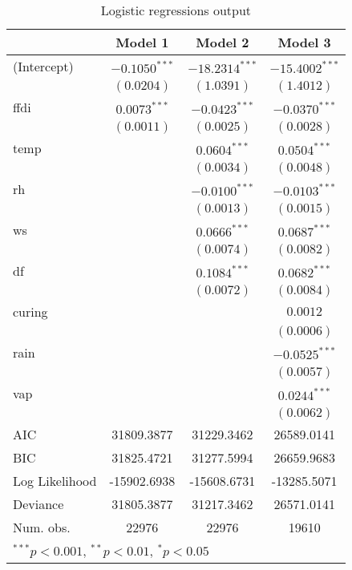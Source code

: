\documentclass{article}
\begin{document}
\begin{table}
	\begin{center}
		\begin{tabular}{l c c c }
			\hline
			& Model 1 & Model 2 & Model 3 \\
		\hline
		(Intercept)    & $-0.1050^{***}$ & $-18.2314^{***}$ & $-15.4002^{***}$ \\
		& $(0.0204)$      & $(1.0391)$       & $(1.4012)$       \\
		ffdi           & $0.0073^{***}$  & $-0.0423^{***}$  & $-0.0370^{***}$  \\
		& $(0.0011)$      & $(0.0025)$       & $(0.0028)$       \\
		temp           &                 & $0.0604^{***}$   & $0.0504^{***}$   \\
		&                 & $(0.0034)$       & $(0.0048)$       \\
		rh             &                 & $-0.0100^{***}$  & $-0.0103^{***}$  \\
		&                 & $(0.0013)$       & $(0.0015)$       \\
		ws             &                 & $0.0666^{***}$   & $0.0687^{***}$   \\
		&                 & $(0.0074)$       & $(0.0082)$       \\
		df             &                 & $0.1084^{***}$   & $0.0682^{***}$   \\
		&                 & $(0.0072)$       & $(0.0084)$       \\
		curing         &                 &                  & $0.0012$         \\
		&                 &                  & $(0.0006)$       \\
		rain           &                 &                  & $-0.0525^{***}$  \\
		&                 &                  & $(0.0057)$       \\
		vap            &                 &                  & $0.0244^{***}$   \\
		&                 &                  & $(0.0062)$       \\
		\hline
		AIC            & 31809.3877      & 31229.3462       & 26589.0141       \\
		BIC            & 31825.4721      & 31277.5994       & 26659.9683       \\
		Log Likelihood & -15902.6938     & -15608.6731      & -13285.5071      \\
		Deviance       & 31805.3877      & 31217.3462       & 26571.0141       \\
		Num. obs.      & 22976           & 22976            & 19610            \\
		\hline
		\multicolumn{4}{l}{\scriptsize{$^{***}p<0.001$, $^{**}p<0.01$, $^*p<0.05$}}
	\end{tabular}
	\caption{Logistic regressions output}
	\label{table:coefficients}
\end{center}
\end{table}
\end{document}
